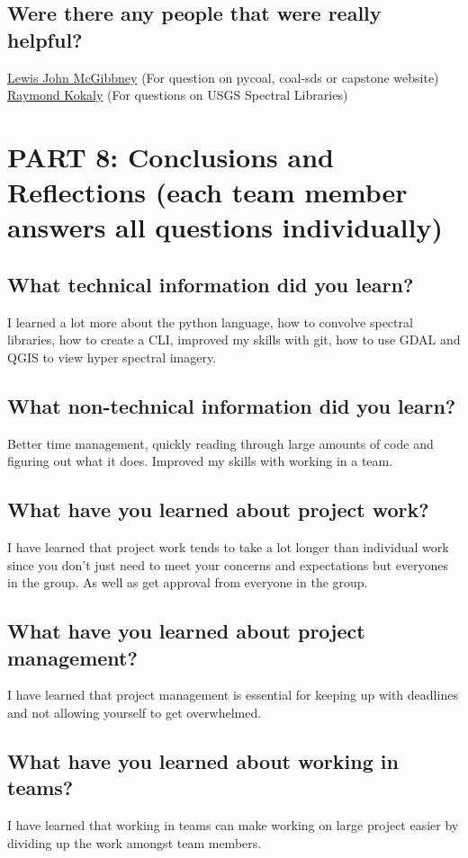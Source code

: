 \documentclass[onecolumn, draftclsnofoot,10pt, compsoc]{IEEEtran}
\begin{document}
\subsection{Were there any people that were really helpful?}
\href{https://github.com/lewismc}{Lewis John McGibbney} (For question on pycoal, coal-sds or capstone website)
\href{https://www.usgs.gov/staff-profiles/raymond-kokaly?qt-staff_profile_science_products=0#qt-staff_profile_science_products}{Raymond Kokaly} (For questions on USGS Spectral Libraries)

\section{PART 8: Conclusions and Reflections (each team member answers all questions individually)}
\subsection{What technical information did you learn?}
I learned a lot more about the python language, how to convolve spectral libraries, how to create a CLI, improved my skills with git, how to use GDAL and QGIS to view hyper spectral imagery. 
\subsection{What non-technical information did you learn?}
Better time management, quickly reading through large amounts of code and figuring out what it does. Improved my skills with working in a team. 
\subsection{What have you learned about project work?}
I have learned that project work tends to take a lot longer than individual work since you don’t just need to meet your concerns and expectations but everyones in the group. As well as get approval from everyone in the group. 
\subsection{What have you learned about project management?}
I have learned that project management is essential for keeping up with deadlines and not allowing yourself to get overwhelmed.
\subsection{What have you learned about working in teams?}
I have learned that working in teams can make working on large project easier by dividing up the work amongst team members. 
\end{document}
